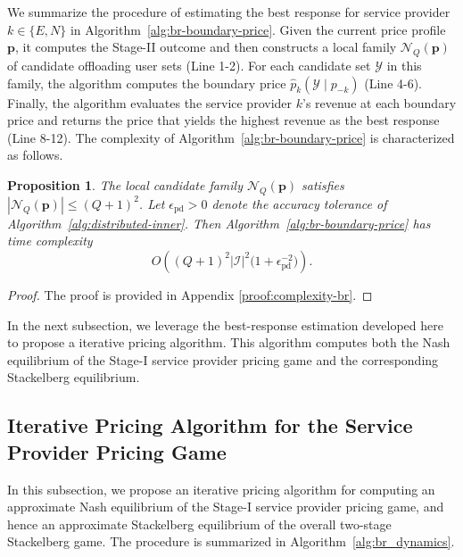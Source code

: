 \documentclass[lettersize,journal]{IEEEtran}
\newtheorem{proposition}{Proposition}
\begin{document}
We summarize the procedure of estimating the best response for service provider $k\in\{E,N\}$ in Algorithm~\ref{alg:br-boundary-price}.  Given the current price profile $\boldsymbol p$, it computes the Stage-II outcome and then constructs a local family $\mathcal N_Q(\boldsymbol p)$ of candidate offloading user sets (Line 1-2). For each candidate set $\mathcal Y$ in this family, the algorithm computes the boundary price $\widehat p_k(\mathcal Y\mid p_{-k})$ (Line 4-6). Finally, the algorithm evaluates the service provider $k$'s revenue at each boundary price and returns the price that yields the highest revenue as the best response (Line 8-12).
The complexity of Algorithm~\ref{alg:br-boundary-price} is characterized as follows.

\begin{proposition}
\label{prop:complexity-br}
The local candidate family $\mathcal{N}_Q(\boldsymbol{p})$ satisfies $|\mathcal{N}_Q(\boldsymbol{p})| \le (Q+1)^2$.
Let $\epsilon_{\mathrm{pd}}>0$ denote the accuracy tolerance of Algorithm~\ref{alg:distributed-inner}. Then Algorithm~\ref{alg:br-boundary-price} has time complexity
\[
O\!\left((Q+1)^2 |\mathcal{I}|^2 \bigl(1+\epsilon_{\mathrm{pd}}^{-2}\bigr)\right).
\]
\end{proposition}

\begin{proof}
The proof is provided in Appendix \ref{proof:complexity-br}.
\end{proof}

In the next subsection, we leverage the best-response estimation developed here to propose a iterative pricing algorithm. This algorithm computes both the Nash equilibrium of the Stage-I service provider pricing game and the corresponding Stackelberg equilibrium.

\subsection{Iterative Pricing Algorithm for the Service Provider Pricing Game}
\label{subsec:br_dynamics}

In this subsection, we propose an iterative pricing algorithm for computing an approximate Nash equilibrium of the Stage-I service provider pricing game, and hence an approximate Stackelberg equilibrium of the overall two-stage Stackelberg game. The procedure is summarized in Algorithm~\ref{alg:br_dynamics}.
\end{document}
